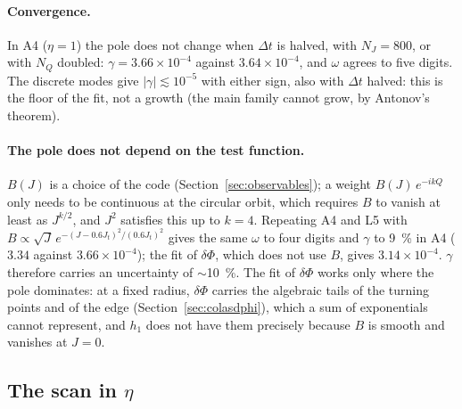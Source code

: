 \documentclass[11pt,a4paper]{article}
\begin{document}
\paragraph{Convergence.} In A4 ($\eta=1$) the pole does not change when $\Delta t$ is halved,
with $N_J=800$, or with $N_Q$ doubled: $\gamma=3.66\times10^{-4}$ against $3.64\times10^{-4}$, and $\omega$ agrees
to five digits. The discrete modes give $|\gamma|\lesssim10^{-5}$ with either sign, also with
$\Delta t$ halved: this is the floor of the fit, not a growth (the main family cannot grow,
by Antonov's theorem).

\paragraph{The pole does not depend on the test function.} $B(J)$ is a choice of the
code (Section~\ref{sec:observables}); a weight $B(J)\,e^{-ikQ}$ only needs to be continuous at
the circular orbit, which requires $B$ to vanish at least as $J^{k/2}$, and $J^2$ satisfies
this up to $k=4$. Repeating A4 and L5 with $B\propto\sqrt J\,e^{-(J-0.6J_t)^2/(0.6J_t)^2}$ gives the
same $\omega$ to four digits and $\gamma$ to \SI{9}{\%} in A4 ($3.34$ against $3.66\times10^{-4}$); the fit of
$\delta\Phi$, which does not use $B$, gives $3.14\times10^{-4}$. $\gamma$ therefore carries an uncertainty
of $\sim$\SI{10}{\%}. The fit of $\delta\Phi$ works only where the pole dominates: at a fixed
radius, $\delta\Phi$ carries the algebraic tails of the turning points and of the edge
(Section~\ref{sec:colasdphi}), which a sum of exponentials cannot represent, and $h_1$ does
not have them precisely because $B$ is smooth and vanishes at $J=0$.

\subsection{The scan in \texorpdfstring{$\eta$}{eta}}
\label{sec:barrido}
\end{document}
